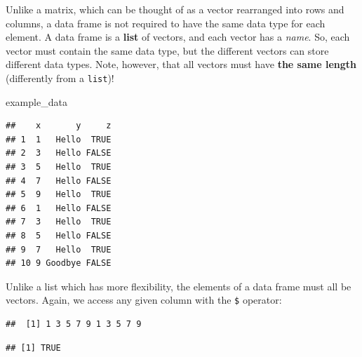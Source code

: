 \documentclass[]{book}
\newenvironment{Shaded}{\begin{snugshade}}{\end{snugshade}}
\newcommand{\KeywordTok}[1]{\textcolor[rgb]{0.13,0.29,0.53}{\textbf{#1}}}
\newcommand{\OperatorTok}[1]{\textcolor[rgb]{0.81,0.36,0.00}{\textbf{#1}}}
\newcommand{\NormalTok}[1]{#1}
\theoremstyle{definition}
\theoremstyle{definition}
\theoremstyle{definition}
\theoremstyle{remark}
\begin{document}
Unlike a matrix, which can be thought of as a vector rearranged into
rows and columns, a data frame is not required to have the same data
type for each element. A data frame is a \textbf{list} of vectors, and
each vector has a \emph{name}. So, each vector must contain the same
data type, but the different vectors can store different data types.
Note, however, that all vectors must have \textbf{the same length}
(differently from a \texttt{list})!

\begin{Shaded}
\begin{Highlighting}[]
\NormalTok{example_data}
\end{Highlighting}
\end{Shaded}

\begin{verbatim}
##    x       y     z
## 1  1   Hello  TRUE
## 2  3   Hello FALSE
## 3  5   Hello  TRUE
## 4  7   Hello FALSE
## 5  9   Hello  TRUE
## 6  1   Hello FALSE
## 7  3   Hello  TRUE
## 8  5   Hello FALSE
## 9  7   Hello  TRUE
## 10 9 Goodbye FALSE
\end{verbatim}

Unlike a list which has more flexibility, the elements of a data frame
must all be vectors. Again, we access any given column with the
\texttt{\$} operator:

\begin{Shaded}
\end{Shaded}

\begin{verbatim}
##  [1] 1 3 5 7 9 1 3 5 7 9
\end{verbatim}

\begin{Shaded}
\end{Shaded}

\begin{verbatim}
## [1] TRUE
\end{verbatim}
\end{document}
